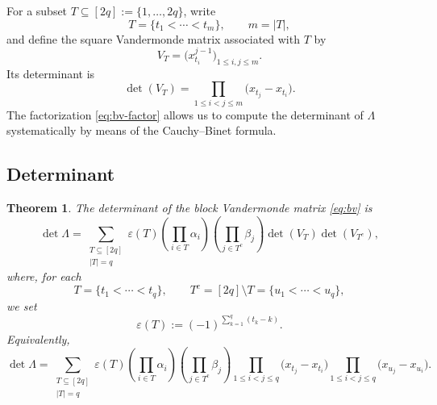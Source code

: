 \documentclass[11pt,a4paper]{article}
\newtheorem{theorem}{Theorem}[section]
\theoremstyle{definition}
\begin{document}
For a subset $T\subseteq[2q]:=\{1,\dots,2q\}$, write
\[
T=\{t_1<\cdots<t_m\},
\qquad
m=|T|,
\]
and define the square Vandermonde matrix associated with $T$ by
\[
V_T
=
\bigl(x_{t_i}^{j-1}\bigr)_{1\le i,j\le m}.
\]
Its determinant is
\[
\det(V_T)
=
\prod_{1\le i<j\le m}
\bigl(x_{t_j}-x_{t_i}\bigr).
\]
The factorization \eqref{eq:bv-factor} allows us to compute the
determinant of $\Lambda$ systematically by means of the
Cauchy--Binet formula.

\subsection{Determinant}

\begin{theorem}\label{thm:det}
The determinant of the block Vandermonde matrix \eqref{eq:bv} is
\begin{equation}\label{eq:block-vandermonde-det}
\det\Lambda
=
\sum_{\substack{T\subseteq[2q]\\ |T|=q}}
\varepsilon(T)
\left(\prod_{i\in T}\alpha_i\right)
\left(\prod_{j\in T^c}\beta_j\right)
\det(V_T)\det(V_{T^c}),
\end{equation}
where, for each
\begin{equation}\label{TT^c}
T=\{t_1<\cdots<t_q\},
\qquad
T^c=[2q]\setminus T=\{u_1<\cdots<u_q\},
\end{equation}
we set
\[
\varepsilon(T)
:=
(-1)^{\sum_{k=1}^q(t_k-k)}.
\]
Equivalently,
\[
\det\Lambda
=
\sum_{\substack{T\subseteq[2q]\\ |T|=q}}
\varepsilon(T)
\left(\prod_{i\in T}\alpha_i\right)
\left(\prod_{j\in T^c}\beta_j\right)
\prod_{1\le i<j\le q}
\bigl(x_{t_j}-x_{t_i}\bigr)
\prod_{1\le i<j\le q}
\bigl(x_{u_j}-x_{u_i}\bigr).
\]
\end{theorem}
\end{document}
